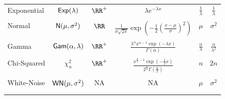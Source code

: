 \begin{longtable}{lccccc}
    Exponential & ${\sf Exp} (\lambda)$         & $\RR^{+}$                      & $\lambda e^{-\lambda x}$                                                                                 & $\frac{1}{\lambda}$      & $\frac{1}{\lambda}$        \\\\
    Normal      & ${\sf N} (\mu, \sigma^2)$   & $\RR$                          & $\frac{1}{\sigma \sqrt{2 \pi}} \exp \left( -\frac{1}{2} \left( \frac{x - \mu}{\sigma} \right)^2 \right)$ & $\mu$                    & $\sigma^2$                 \\\\
    Gamma       & ${\sf Gam} (\alpha, \lambda)$ & $\RR^{+}$                      & $\frac{\lambda^{\alpha} x^{\alpha - 1} \exp (-\lambda x)}{\Gamma (\alpha)}$                              & $\frac{\alpha}{\lambda}$ & $\frac{\alpha}{\lambda^2}$ \\\\
    Chi-Squared & $\chi^2_{n}$               & $\RR^{+}$                      & $\frac{x^{\frac{n}{2} - 1} \exp (-\frac{1}{2} x)}{2^{\frac{n}{2}} \Gamma (\frac{n}{2})}$                 & $n$                      & $2n$                       \\\\
    White-Noise & ${\sf WN} (\mu , \sigma^2)$               & NA                      & NA                 & $\mu$                      & $\sigma^2$                       \\\\

    \\\bottomrule
    \hline
\end{longtable}